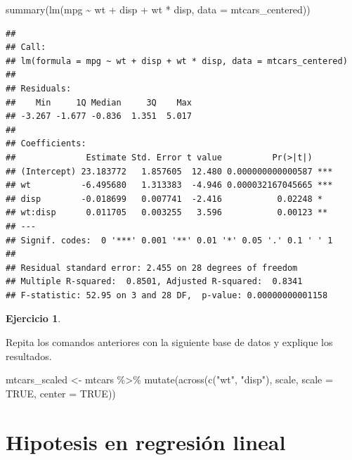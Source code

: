 \documentclass[
  12pt,
]{book}
\newenvironment{Shaded}{\begin{snugshade}}{\end{snugshade}}
\newcommand{\AttributeTok}[1]{\textcolor[rgb]{0.77,0.63,0.00}{#1}}
\newcommand{\ConstantTok}[1]{\textcolor[rgb]{0.00,0.00,0.00}{#1}}
\newcommand{\FunctionTok}[1]{\textcolor[rgb]{0.00,0.00,0.00}{#1}}
\newcommand{\NormalTok}[1]{#1}
\newcommand{\OtherTok}[1]{\textcolor[rgb]{0.56,0.35,0.01}{#1}}
\newcommand{\SpecialCharTok}[1]{\textcolor[rgb]{0.00,0.00,0.00}{#1}}
\newcommand{\StringTok}[1]{\textcolor[rgb]{0.31,0.60,0.02}{#1}}
\theoremstyle{definition}
\theoremstyle{definition}
\theoremstyle{definition}
\newtheorem{exercise}{Ejercicio}[chapter]
\theoremstyle{remark}
\begin{document}
\begin{Shaded}
\begin{Highlighting}[]
\FunctionTok{summary}\NormalTok{(}\FunctionTok{lm}\NormalTok{(mpg }\SpecialCharTok{\textasciitilde{}}\NormalTok{ wt }\SpecialCharTok{+}\NormalTok{ disp }\SpecialCharTok{+}\NormalTok{ wt }\SpecialCharTok{*}\NormalTok{ disp, }\AttributeTok{data =}\NormalTok{ mtcars\_centered))}
\end{Highlighting}
\end{Shaded}

\begin{verbatim}
## 
## Call:
## lm(formula = mpg ~ wt + disp + wt * disp, data = mtcars_centered)
## 
## Residuals:
##    Min     1Q Median     3Q    Max 
## -3.267 -1.677 -0.836  1.351  5.017 
## 
## Coefficients:
##              Estimate Std. Error t value          Pr(>|t|)    
## (Intercept) 23.183772   1.857605  12.480 0.000000000000587 ***
## wt          -6.495680   1.313383  -4.946 0.000032167045665 ***
## disp        -0.018699   0.007741  -2.416           0.02248 *  
## wt:disp      0.011705   0.003255   3.596           0.00123 ** 
## ---
## Signif. codes:  0 '***' 0.001 '**' 0.01 '*' 0.05 '.' 0.1 ' ' 1
## 
## Residual standard error: 2.455 on 28 degrees of freedom
## Multiple R-squared:  0.8501, Adjusted R-squared:  0.8341 
## F-statistic: 52.95 on 3 and 28 DF,  p-value: 0.00000000001158
\end{verbatim}

\begin{exercise}
\protect\hypertarget{exr:unlabeled-div-48}{}\label{exr:unlabeled-div-48}

Repita los comandos anteriores con la siguiente base de datos y explique los resultados.

\begin{Shaded}
\begin{Highlighting}[]
\NormalTok{mtcars\_scaled }\OtherTok{\textless{}{-}}\NormalTok{ mtcars }\SpecialCharTok{\%\textgreater{}\%} \FunctionTok{mutate}\NormalTok{(}\FunctionTok{across}\NormalTok{(}\FunctionTok{c}\NormalTok{(}\StringTok{"wt"}\NormalTok{, }\StringTok{"disp"}\NormalTok{), }
\NormalTok{    scale, }\AttributeTok{scale =} \ConstantTok{TRUE}\NormalTok{, }\AttributeTok{center =} \ConstantTok{TRUE}\NormalTok{))}
\end{Highlighting}
\end{Shaded}

\end{exercise}

\hypertarget{hipotesis-en-regresiuxf3n-lineal}{%
\section{Hipotesis en regresión lineal}\label{hipotesis-en-regresiuxf3n-lineal}}
\end{document}
